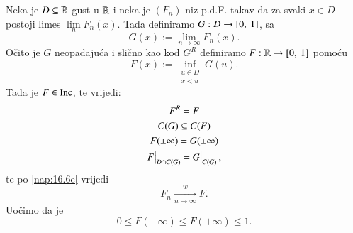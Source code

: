 \begin{nap}
\begin{enumerate}[label=(\alph*)]
        Neka je $D \subseteq \mathbb{R}$ gust u $\mathbb{R}$ i neka je $(F_n)$ niz p.d.F. takav da za svaki $x \in D$ postoji limes $\lim\limits_n F_n (x)$.
        Tada definiramo $G : D \to [{0}, \:{1}]$, sa 
        \begin{equation*}
            G(x) := \lim\limits_{n \to \infty} F_n (x).
        \end{equation*}
        O\v cito je $G$ neopadaju\' ca i sli\v cno kao kod $G^R$ definiramo $F:\mathbb{R} \to [{0}, \:{1}]$ pomo\' cu
        \begin{equation*}
            F (x) := \inf\limits_{
                \begin{smallmatrix}
                    u \in D\\
                    x < u
                \end{smallmatrix}
            } G(u).
        \end{equation*}
        Tada je $F \in \mathrm{Inc}$, te vrijedi:
        \begin{equation*}
            \begin{gathered}
                F^R = F\\
                C(G) \subseteq C(F)\\
                F(\pm \infty) = G(\pm \infty)\\
                \restr{F}{D \cap C(G)} = \restr{G}{C(G)},
            \end{gathered}
        \end{equation*}
        te po \ref{nap:16.6e} vrijedi
        \begin{equation*}
            F_n \xrightarrow[n \to \infty]{w} F.
        \end{equation*}
        Uo\v cimo da je
        \begin{equation*}
            0 \leq F(-\infty) \leq F(+\infty) \leq 1.
        \end{equation*}
    \end{enumerate}
\end{nap}

